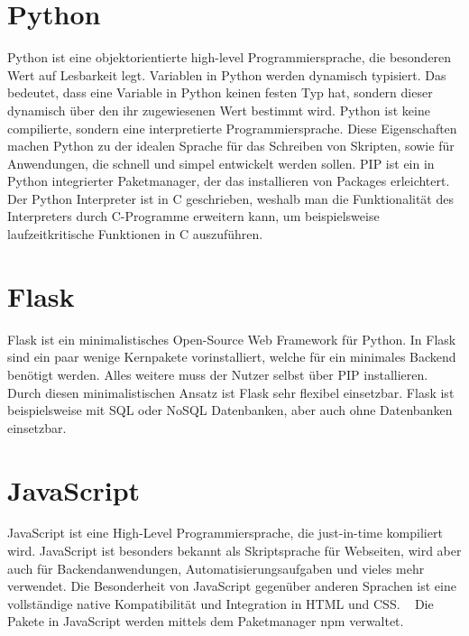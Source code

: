 \section{Python}
\label{sec:python}

Python ist eine objektorientierte high-level Programmiersprache, die besonderen Wert auf Lesbarkeit legt.
Variablen in Python werden dynamisch typisiert.
Das bedeutet, dass eine Variable in Python keinen festen Typ hat, sondern dieser dynamisch über den ihr zugewiesenen Wert bestimmt wird.
Python ist keine compilierte, sondern eine interpretierte Programmiersprache.
Diese Eigenschaften machen Python zu der idealen Sprache für das Schreiben von Skripten, sowie für Anwendungen, die schnell und simpel entwickelt werden sollen.
PIP ist ein in Python integrierter Paketmanager, der das installieren von Packages erleichtert.
Der Python Interpreter ist in C geschrieben, weshalb man die Funktionalität des Interpreters durch C-Programme erweitern kann, um beispielsweise laufzeitkritische Funktionen in C auszuführen.
~\autocite{van:python}

\section{Flask}
\label{sec:flask}

Flask ist ein minimalistisches Open-Source Web Framework für Python.
In Flask sind ein paar wenige Kernpakete vorinstalliert, welche für ein minimales Backend benötigt werden.
Alles weitere muss der Nutzer selbst über PIP installieren.
~\autocite{grindberg:flask}
Durch diesen minimalistischen Ansatz ist Flask sehr flexibel einsetzbar.
Flask ist beispielsweise mit SQL oder NoSQL Datenbanken, aber auch ohne Datenbanken einsetzbar.


\section{JavaScript}
\label{sec:js}

JavaScript ist eine High-Level Programmiersprache, die just-in-time kompiliert wird.
JavaScript ist besonders bekannt als Skriptsprache für Webseiten, wird aber auch für Backendanwendungen, Automatisierungsaufgaben und vieles mehr verwendet.
Die Besonderheit von JavaScript gegenüber anderen Sprachen ist eine vollständige native Kompatibilität und Integration in HTML und CSS.
~\autocite{javascript:javascript}
Die Pakete in JavaScript werden mittels dem Paketmanager npm verwaltet.


